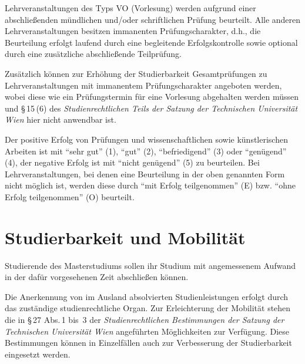 Lehrveranstaltungen des Typs VO (Vorlesung) werden aufgrund einer
abschließenden mündlichen und/oder schriftlichen Prüfung
beurteilt. Alle anderen Lehrveranstaltungen besitzen immanenten
Prüfungscharakter, d.h., die Beurteilung erfolgt laufend durch eine
begleitende Erfolgskontrolle sowie optional durch eine zusätzliche
abschließende Teilprüfung.

Zusätzlich können zur Erhöhung der Studierbarkeit Gesamtprüfungen zu
Lehrveranstaltungen mit immanentem Prüfungscharakter angeboten werden,
wobei diese wie ein Prüfungstermin für eine Vorlesung abgehalten
werden müssen und \S\,15\,(6) des \emph{Studienrechtlichen Teils der 
Satzung der Technischen Universität Wien} hier nicht anwendbar ist.

Der positive Erfolg von Prüfungen und wissenschaftlichen sowie
künstlerischen Arbeiten ist mit "`sehr gut"' (1), "`gut"'
(2), "`befriedigend"' (3) oder "`genügend"' (4), der negative Erfolg
ist mit "`nicht genügend"' (5) zu beurteilen. Bei Lehrveranstaltungen, 
bei denen eine Beurteilung in der oben genannten Form nicht möglich ist, 
werden diese durch "`mit Erfolg teilgenommen"' (E) bzw. 
"`ohne Erfolg teilgenommen"' (O) beurteilt.

%

\section{Studierbarkeit und Mobilität}\label{sec:SM}

Studierende des Masterstudiums \emph{} sollen ihr
Studium mit angemessenem Aufwand in der dafür vorgesehenen Zeit
abschließen können.

%

Die Anerkennung von im Ausland absolvierten Studienleistungen erfolgt
durch das zuständige studienrechtliche Organ.  Zur Erleichterung der
Mobilität stehen die in \S\,27 Abs.\,1 bis~3 der
\emph{Studienrechtlichen Bestimmungen der Satzung der Technischen
  Universität Wien} angeführten Möglichkeiten zur Verfügung. Diese
Bestimmungen können in Einzelfällen auch zur Verbesserung der
Studierbarkeit eingesetzt werden.
%

